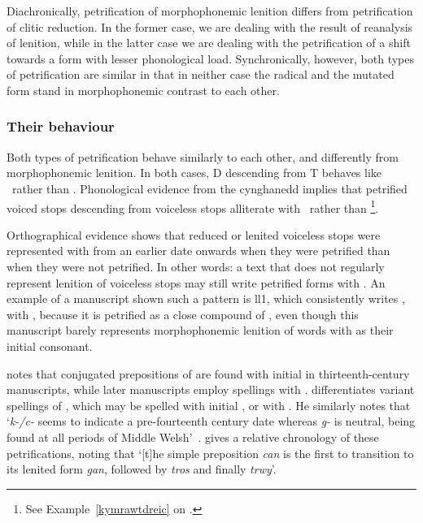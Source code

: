 Diachronically, petrification of morphophonemic lenition differs from petrification of clitic reduction. 
In the former case, we are dealing with the result of reanalysis of lenition, while in the latter case we are dealing with the petrification of a shift towards a form with lesser phonological load. 
Synchronically, however, both types of petrification are similar in that in neither case the radical and the mutated form stand in morphophonemic contrast to each other. 

\subsubsection{Their behaviour}
\label{sec:their-behaviour}
Both types of petrification behave similarly to each other, and differently from morphophonemic lenition. 
In both cases, \gls{D} descending from \gls{T} behaves like \xD\ rather than \lT. Phonological evidence from the cynghanedd implies that petrified voiced stops descending from voiceless stops alliterate with \xD\ rather than \lT\footnote{See Example~\ref{kymrawtdreic} on .}.

Orthographical evidence shows that reduced or lenited voiceless stops were represented with  from an earlier date onwards when they were petrified than when they were not petrified. 
In other words: a text that does not regularly represent lenition of voiceless stops may still write petrified forms with . 
An example of a manuscript shown such a pattern is \gls{ll1}, which consistently writes , with , because it is petrified as a close compound of , even though this manuscript barely represents morphophonemic lenition of words with  as their initial consonant.

\Textcite[52]{jongeleen_lenition_2016} notes that conjugated prepositions of  are found with initial   in thirteenth-century manuscripts, while later manuscripts employ spellings with .
\Textcite{sims-williams_variation_2013} differentiates variant spellings of , which may be spelled with initial , or with .
He similarly notes that `\textit{k-/c-} seems to indicate a pre-fourteenth century date whereas \textit{g-} is neutral, being found at all periods of Middle Welsh'~\autocite[24]{sims-williams_variation_2013}. \Textcite[55]{jongeleen_lenition_2016} gives a relative chronology of these petrifications, noting that `[t]he simple preposition \textit{can} is the first to transition to its lenited form \textit{gan}, followed by \textit{tros} and finally \textit{trwy}'.

